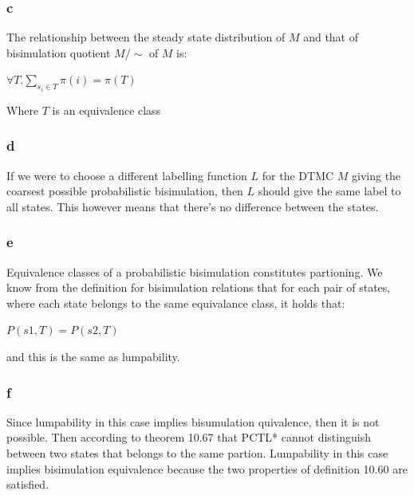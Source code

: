 \subsubsection{c}
The relationship between the steady state distribution of $M$ and that of bisimulation quotient $M/\sim$ of $M$ is:

$\forall T. \sum_{s_i \in T} \pi(i)=\pi(T)$

Where $T$ is an equivalence class

\subsubsection{d}
If we were to choose a different labelling function $L$ for the DTMC $M$ giving the coarsest possible probabilistic bisimulation, then $L$ should give the same label to all states.
This however means that there's no difference between the states.

\subsubsection{e}
Equivalence classes of a probabilistic bisimulation constitutes partioning. We know from the definition for bisimulation relations that for each pair of states, where each state belongs to the same
equivalance class, it holds that:

$P(s1,T)=P(s2,T)$

and this is the same as lumpability.

\subsubsection{f}
Since lumpability in this case implies bisumulation quivalence, then it is not possible. Then according to theorem 10.67 that PCTL* cannot distinguish between two states that belongs to the same partion.
Lumpability in this case implies bisimulation equivalence because the two properties of definition 10.60 are satisfied.

